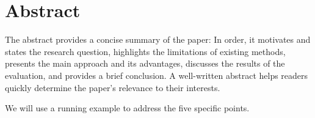 
\chapter{Abstract}
\label{ch:abstract}

The abstract provides a concise summary of the paper:
In order, it motivates and states the research question, highlights the limitations of existing methods, presents the main approach and its advantages, discusses the results of the evaluation, and provides a brief conclusion.
A well-written abstract helps readers quickly determine the paper's relevance to their interests.

We will use a running example to address the five specific points.







